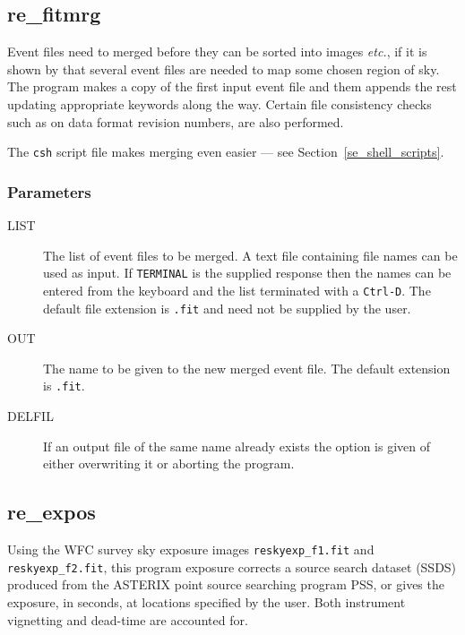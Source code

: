 \subsection{\label{ss_re_fitmrg}re\_fitmrg}

Event files need to merged before they can be sorted into images
\emph{etc.}, if it is shown by 
that several event files are needed to map some chosen region of sky.
The program makes a copy of the first input event file and them appends
the rest updating appropriate keywords along the way.  Certain file
consistency checks such as on data format revision numbers, are also
performed.

The {\tt csh} script file 
makes merging even easier --- see Section~\ref{se_shell_scripts}.

\subsubsection{Parameters}

\begin{description}

\item[LIST  ]
The list of event files to be merged.  A text file containing file
names can be used as input.  If {\tt TERMINAL} is the supplied response
then the names can be entered from the keyboard and the list terminated
with a {\tt Ctrl-D}.  The default file extension is {\tt .fit} and need
not be supplied by the user.
\item[OUT  ]
The name to be given to the new merged event file.  The default extension is
{\tt .fit}.
\item[DELFIL ]
If an output file of the same name already exists the option is given of
either overwriting it or aborting the program.
\end{description}

\subsection{\label{ss_re_expos}re\_expos}

Using the \ro WFC survey sky exposure images {\tt reskyexp\_f1.fit} and
{\tt reskyexp\_f2.fit}, this program exposure corrects a source search
dataset (SSDS) produced from the ASTERIX point source searching program
PSS, or gives the exposure, in seconds, at locations specified by the
user. Both instrument vignetting and dead-time are accounted for.

